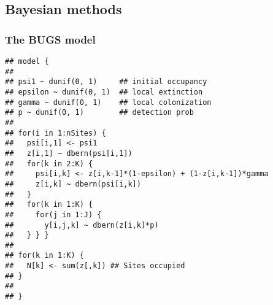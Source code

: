 \documentclass[color=usenames,dvipsnames]{beamer}\usepackage[]{graphicx}\usepackage[]{color}
\makeatletter
\newenvironment{kframe}{%
 \def\at@end@of@kframe{}%
 \ifinner\ifhmode%
  \def\at@end@of@kframe{\end{minipage}}%
  \begin{minipage}{\columnwidth}%
 \fi\fi%
 \def\FrameCommand##1{\hskip\@totalleftmargin \hskip-\fboxsep
 \colorbox{shadecolor}{##1}\hskip-\fboxsep
     \hskip-\linewidth \hskip-\@totalleftmargin \hskip\columnwidth}%
 \MakeFramed {\advance\hsize-\width
   \@totalleftmargin\z@ \linewidth\hsize
   \@setminipage}}%
 {\par\unskip\endMakeFramed%
 \at@end@of@kframe}
\newenvironment{knitrout}{}{} %
\makeatother
\begin{document}







\subsection{Bayesian methods}



\begin{frame}[fragile]
  \frametitle{The BUGS model}
\begin{knitrout}\scriptsize
{}\color{fgcolor}\begin{kframe}
\begin{verbatim}
## model {
## 
## psi1 ~ dunif(0, 1)     ## initial occupancy
## epsilon ~ dunif(0, 1)  ## local extinction
## gamma ~ dunif(0, 1)    ## local colonization
## p ~ dunif(0, 1)        ## detection prob
## 
## for(i in 1:nSites) {
##   psi[i,1] <- psi1
##   z[i,1] ~ dbern(psi[i,1])
##   for(k in 2:K) {
##     psi[i,k] <- z[i,k-1]*(1-epsilon) + (1-z[i,k-1])*gamma
##     z[i,k] ~ dbern(psi[i,k])
##   }
##   for(k in 1:K) {
##     for(j in 1:J) {
##       y[i,j,k] ~ dbern(z[i,k]*p)
##   } } }
## 
## for(k in 1:K) {
##   N[k] <- sum(z[,k]) ## Sites occupied
## }
## 
## }
\end{verbatim}
\end{kframe}
\end{knitrout}
\end{frame}
\end{document}
